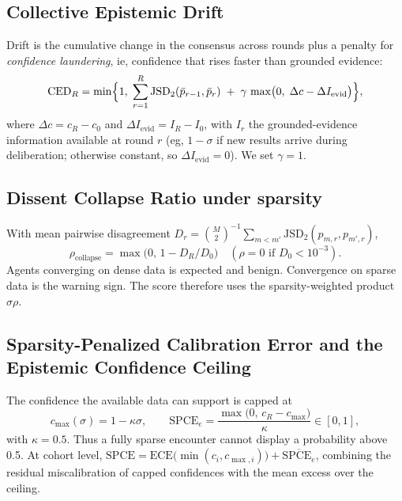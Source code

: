 \documentclass[11pt]{article}
\newcommand{\JSD}{\mathrm{JSD}_2}
\begin{document}
\subsection{Collective Epistemic Drift}
Drift is the cumulative change in the consensus across rounds plus a penalty for \emph{confidence laundering}, ie,
confidence that rises faster than grounded evidence:
\begin{equation}
\mathrm{CED}_R=\min\Bigl\{1,\;\sum_{r=1}^{R}\JSD(\bar p_{r-1},\bar p_r)\;+\;\gamma\,\max\bigl(0,\;\Delta c-\Delta I_{\mathrm{evid}}\bigr)\Bigr\},
\end{equation}
where $\Delta c=c_R-c_0$ and $\Delta I_{\mathrm{evid}}=I_R-I_0$, with $I_r$ the grounded-evidence information available
at round $r$ (eg, $1-\sigma$ if new results arrive during deliberation; otherwise constant, so $\Delta I_{\mathrm{evid}}=0$).
We set $\gamma=1$.

\subsection{Dissent Collapse Ratio under sparsity}
With mean pairwise disagreement $D_r=\binom{M}{2}^{-1}\sum_{m<m'}\JSD(p_{m,r},p_{m',r})$,
\begin{equation}
\rho_{\mathrm{collapse}}=\max\bigl(0,\,1-D_R/D_0\bigr)\quad(\rho=0\text{ if }D_0<10^{-3}).
\end{equation}
Agents converging on dense data is expected and benign. Convergence on sparse data is the warning sign. The score
therefore uses the sparsity-weighted product $\sigma\rho$.

\subsection{Sparsity-Penalized Calibration Error and the Epistemic Confidence Ceiling}
The confidence the available data can support is capped at
\begin{equation}
c_{\max}(\sigma)=1-\kappa\sigma,\qquad
\mathrm{SPCE}_e=\frac{\max\bigl(0,\,c_R-c_{\max}\bigr)}{\kappa}\in[0,1],
\end{equation}
with $\kappa=0.5$. Thus a fully sparse encounter cannot display a probability above 0.5. At cohort level,
$\mathrm{SPCE}=\mathrm{ECE}\bigl(\min(c_i,c_{\max,i})\bigr)+\overline{\mathrm{SPCE}_e}$, combining the residual
miscalibration of capped confidences\cite{guo2017,naeini2015} with the mean excess over the ceiling.
\end{document}
